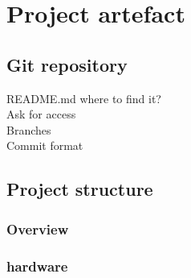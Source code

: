 \chapter{Project artefact}


\section{Git repository}
README.md
where to find it?\\
Ask for access\\
Branches \\
Commit format \\

\section{Project structure}
\subsection{Overview}
\subsection{hardware}\label{npsc_harware}